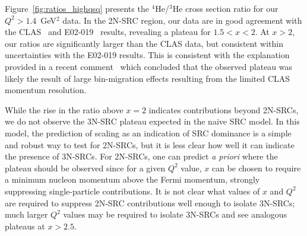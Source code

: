 \documentclass[aps,prl,superscriptaddress,showpacs,twocolumn,floatfix,amsmath,amssymb]{revtex4-1}
\begin{document}
Figure~\ref{fig:ratios_highqsq} presents the $^4$He/$^3$He cross section ratio for our $Q^2 > 1.4$~GeV$^2$
data. In the 2N-SRC region, our data are in good agreement with the CLAS~\cite{PhysRevLett.96.082501} and
E02-019~\cite{fomin2012} results, revealing a plateau for $1.5 < x < 2$. At $x>2$, our
ratios are significantly larger than the CLAS data, but consistent within uncertainties with the E02-019
results. This is consistent with the explanation provided in a recent comment~\cite{Higinbotham:2014xna}
which concluded that the observed plateau was likely the result of large bin-migration effects resulting from
the limited CLAS momentum resolution.

While the rise in the ratio above $x=2$ indicates contributions beyond 2N-SRCs, we do not observe the 3N-SRC
plateau expected in the naive SRC model. In this model, the prediction of scaling as an indication of SRC
dominance is a simple and robust way to test for 2N-SRCs, but it is less clear how well it can indicate the
presence of 3N-SRCs. For 2N-SRCs, one can predict \textit{a priori} where the plateau should be observed
since for a given $Q^2$ value, $x$ can be chosen to require a minimum nucleon momentum above the Fermi
momentum, strongly suppressing single-particle contributions. It is not clear what values of $x$ and $Q^2$
are required to suppress 2N-SRC contributions well enough to isolate 3N-SRCs; much larger $Q^2$ values may
be required to isolate 3N-SRCs and see analogous plateaus at $x>2.5$.
\end{document}
